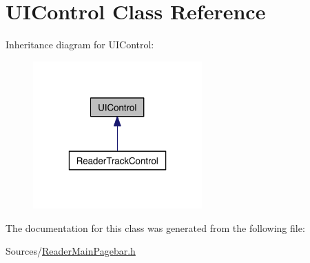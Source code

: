 \hypertarget{class_u_i_control}{\section{U\-I\-Control Class Reference}
\label{de/dbf/class_u_i_control}
}


Inheritance diagram for U\-I\-Control\-:
\nopagebreak
\begin{figure}[H]
\begin{center}
\leavevmode
\includegraphics[width=184pt]{d6/d53/class_u_i_control__inherit__graph}
\end{center}
\end{figure}


The documentation for this class was generated from the following file\-:\begin{DoxyCompactItemize}
\item 
Sources/\hyperlink{_reader_main_pagebar_8h}{Reader\-Main\-Pagebar.\-h}\end{DoxyCompactItemize}
